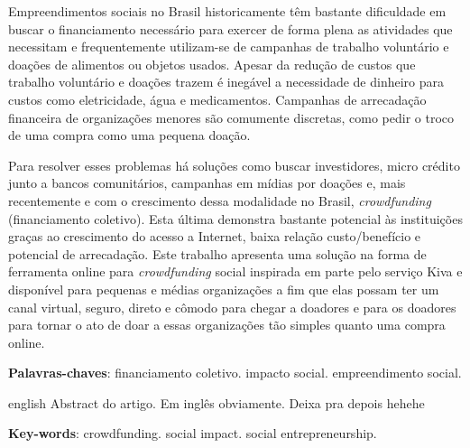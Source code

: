 \begin{resumo}
Empreendimentos sociais no Brasil historicamente têm bastante dificuldade em buscar o financiamento necessário para exercer de forma plena as atividades que necessitam e frequentemente utilizam-se de campanhas de trabalho voluntário e doações de alimentos ou objetos usados. Apesar da redução de custos que trabalho voluntário e doações trazem é inegável a necessidade de dinheiro para custos como eletricidade, água e medicamentos. Campanhas de arrecadação financeira de organizações menores são comumente discretas, como pedir o troco de uma compra como uma pequena doação.

Para resolver esses problemas há soluções como buscar investidores, micro crédito junto a bancos comunitários, campanhas em mídias por doações e, mais recentemente e com o crescimento dessa modalidade no Brasil, \emph{crowdfunding} (financiamento coletivo). Esta última demonstra bastante potencial às instituições graças ao crescimento do acesso a Internet, baixa relação custo/benefício e potencial de arrecadação.  Este trabalho apresenta uma solução na forma de ferramenta online para \emph{crowdfunding} social inspirada em parte pelo serviço Kiva \cite{flannery2007kiva} e disponível para pequenas e médias organizações a fim que elas possam ter um canal virtual, seguro, direto e cômodo para chegar a doadores e para os doadores para tornar o ato de doar a essas organizações tão simples quanto uma compra online.

  \vspace{\onelineskip}
  \noindent
  \textbf{Palavras-chaves}: financiamento coletivo. impacto social. empreendimento social.
\end{resumo}

\begin{resumo}[Abstract]
	\begin{otherlanguage*}{english}
		Abstract do artigo. Em inglês obviamente. Deixa pra depois hehehe
        
		\vspace{\onelineskip}
		\noindent
		\textbf{Key-words}: crowdfunding. social impact. social entrepreneurship.
	\end{otherlanguage*}
\end{resumo}